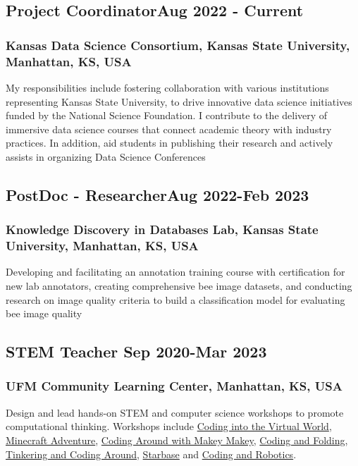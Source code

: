 \documentclass[11pt]{article}
\begin{document}
\subsection{Project Coordinator\hfill \normalfont Aug 2022 - Current}  
\subsubsection{Kansas Data Science Consortium, Kansas State University,  Manhattan, KS, USA}
 \noindent
My responsibilities include fostering collaboration with various institutions representing Kansas State University, to drive innovative data science initiatives funded by the National Science Foundation. I contribute to the delivery of immersive data science courses that connect academic theory with industry practices. In addition, aid students in publishing their research and actively assists in organizing Data Science Conferences
\newline



\subsection{PostDoc - Researcher\hfill \normalfont Aug 2022-Feb 2023}  
\subsubsection{Knowledge Discovery in Databases Lab, Kansas State University, Manhattan, KS, USA}
 \noindent
Developing and facilitating an annotation training course with certification for new lab annotators, creating comprehensive bee image datasets, and conducting research on image quality criteria to build a classification model for evaluating bee image quality

\vspace{0.8em} %

\subsection{STEM Teacher \hfill \normalfont Sep 2020-Mar 2023}  
\subsubsection{UFM Community Learning Center,  Manhattan, KS, USA}
 \noindent
Design and lead hands-on STEM and computer science workshops to promote computational thinking. Workshops include \hyperref[sec: VR]{Coding into the Virtual World}, \hyperref[sec: Minecraft1]{Minecraft Adventure}, \hyperref[sec: MakeyMakey1]{Coding Around with Makey Makey}, \hyperref[sec: CodingFolding]{Coding and Folding}, \hyperref[sec: Tinkering]{Tinkering and Coding Around}, \hyperref[sec: Starbase]{Starbase}  and   \hyperref[sec: Robotics1]{Coding and Robotics}. 
\end{document}
